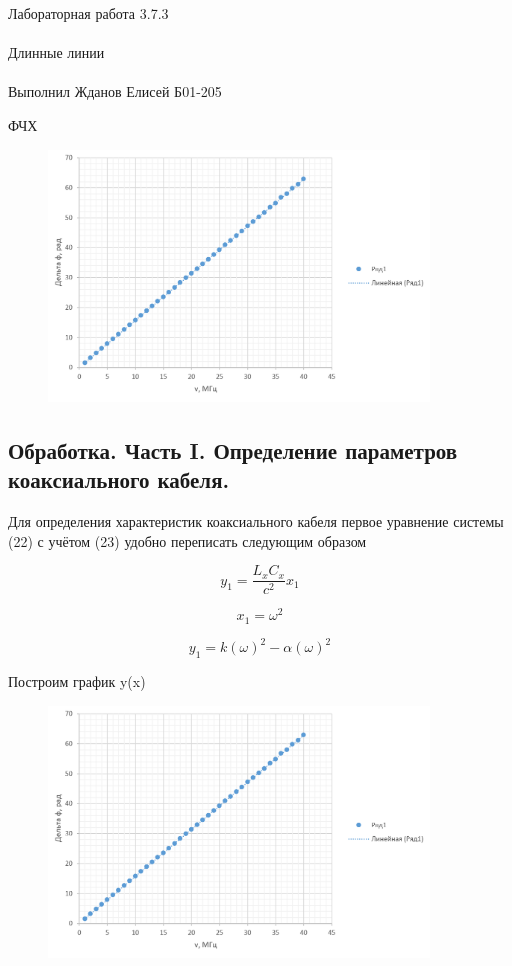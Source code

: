\documentclass{astroedu-lab}
\begin{document}
\begin{problem}{\huge Лабораторная работа 3.7.3\\\\Длинные линии\\\\Выполнил Жданов Елисей Б01-205}
\begin{center}
	\Large ФЧХ
\end{center}

\begin{figure}[!h]
	\centering
	\includegraphics[width=0.9\textwidth]{фчх.png}
	\label{fig:boiler}
\end{figure}

\newpage

\subsection{Обработка. Часть I. Определение параметров коаксиального кабеля.}

Для определения характеристик коаксиального кабеля первое уравнение системы (22) с учётом (23) удобно переписать следующим образом

\begin{equation}
	y_1 = \frac{L_x C_x}{c^2} x_1
\end{equation}

\begin{equation}
	x_1 = \omega^2
\end{equation}

\begin{equation}
	y_1 = k(\omega)^2 - \alpha (\omega)^2
\end{equation}

Построим график y(x)

\begin{figure}[!h]
	\centering
	\includegraphics[width=0.9\textwidth]{фчх.png}
	\label{fig:boiler}
\end{figure}


\end{problem}
\end{document}
